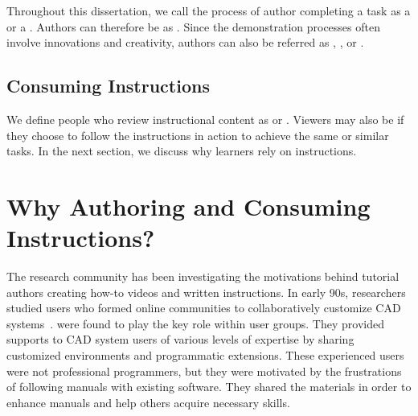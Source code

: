 Throughout this dissertation, we call the process of author completing a task as a  or a . Authors can therefore be as .
%
Since the demonstration processes often involve innovations and creativity, authors can also be referred as , , or .
%


\subsection{Consuming Instructions}
We define people who review instructional content as  or . Viewers may also be  if they choose to follow the instructions in action to achieve the same or similar tasks. In the next section, we discuss why learners rely on instructions.



\section{Why Authoring and Consuming Instructions?}
\label{background_why}

The research community has been investigating the motivations behind tutorial authors creating how-to videos and written instructions.
%
In early 90s, researchers studied users who formed online communities to collaboratively customize CAD systems~\cite{Gantt:1992:GGP:142750.142767}.  were found to play the key role within user groups. They provided supports to CAD system users of various levels of expertise by sharing customized environments and programmatic extensions. These experienced users were not professional programmers, but they were motivated by the frustrations of following manuals with existing software. They shared the materials in order to enhance manuals and help others acquire necessary skills.


